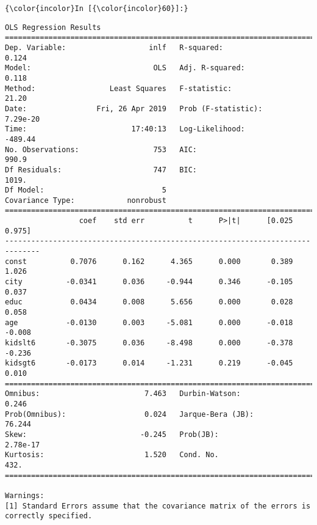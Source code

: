 \documentclass[11pt]{article}
\begin{document}
    \begin{Verbatim}[commandchars=\\\{\}]
{\color{incolor}In [{\color{incolor}60}]:} 
\end{Verbatim}


    \begin{Verbatim}[commandchars=\\\{\}]
                            OLS Regression Results                            
==============================================================================
Dep. Variable:                   inlf   R-squared:                       0.124
Model:                            OLS   Adj. R-squared:                  0.118
Method:                 Least Squares   F-statistic:                     21.20
Date:                Fri, 26 Apr 2019   Prob (F-statistic):           7.29e-20
Time:                        17:40:13   Log-Likelihood:                -489.44
No. Observations:                 753   AIC:                             990.9
Df Residuals:                     747   BIC:                             1019.
Df Model:                           5                                         
Covariance Type:            nonrobust                                         
==============================================================================
                 coef    std err          t      P>|t|      [0.025      0.975]
------------------------------------------------------------------------------
const          0.7076      0.162      4.365      0.000       0.389       1.026
city          -0.0341      0.036     -0.944      0.346      -0.105       0.037
educ           0.0434      0.008      5.656      0.000       0.028       0.058
age           -0.0130      0.003     -5.081      0.000      -0.018      -0.008
kidslt6       -0.3075      0.036     -8.498      0.000      -0.378      -0.236
kidsgt6       -0.0173      0.014     -1.231      0.219      -0.045       0.010
==============================================================================
Omnibus:                        7.463   Durbin-Watson:                   0.246
Prob(Omnibus):                  0.024   Jarque-Bera (JB):               76.244
Skew:                          -0.245   Prob(JB):                     2.78e-17
Kurtosis:                       1.520   Cond. No.                         432.
==============================================================================

Warnings:
[1] Standard Errors assume that the covariance matrix of the errors is correctly specified.

    \end{Verbatim}
\end{document}
